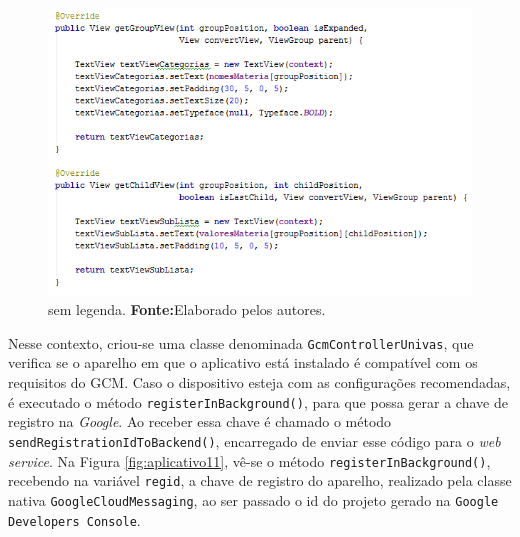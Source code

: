 	\begin{figure}[h!] 
		\centerline{\includegraphics[scale=0.60]{./imagens/2_q_metodologico/4_procedimentos_resultados/42_aplicativo/aplicativo10.png}}
		\caption[sem legenda]{sem legenda. \textbf{Fonte:}Elaborado pelos autores.}
		\label{fig:aplicativo10}
	\end{figure}
	
	\pagebreak
	
	\par Nesse contexto, criou-se uma classe denominada
\texttt{GcmControllerUnivas}, que verifica se o aparelho em que o aplicativo
está instalado é compatível com os requisitos do GCM. Caso o dispositivo esteja
com as configurações recomendadas, é executado o método
\texttt{registerInBackground()}, para que possa gerar a chave de registro na
\textit{Google}. Ao receber essa chave é chamado o método
\texttt{sendRegistrationIdToBackend()}, encarregado de enviar esse código para
o \textit{web service}. Na Figura \ref{fig:aplicativo11}, vê-se o método
\texttt{registerInBackground()}, recebendo na variável \texttt{regid}, a chave
de registro do aparelho, realizado pela classe nativa
\texttt{GoogleCloudMessaging}, ao ser passado o id do projeto gerado na
\texttt{Google Developers Console}.

